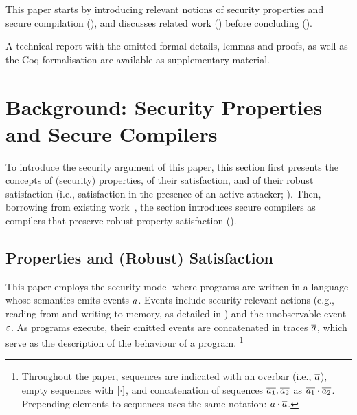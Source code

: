 \documentclass[dvipsnames,conference]{IEEEtran}
\theoremstyle{definition}
\begin{document}
% 
This paper starts by introducing relevant notions of security properties and secure compilation (),
and discusses related work () before concluding ().

 A technical report with the omitted formal details, lemmas and proofs, as well as the Coq formalisation are available as supplementary material.

\section{Background: Security Properties and Secure Compilers}\label{sec:background}

To introduce the security argument of this paper, this section first presents the concepts of (security) properties, of their satisfaction, and of their robust satisfaction (i.e., satisfaction in the presence of an active attacker; ).
Then, borrowing from existing work~\cite{abate2019jour,abate2021extacc}, the section introduces secure compilers as compilers that preserve robust property satisfaction ().

\subsection{Properties and (Robust) Satisfaction}\label{subsec:bg:tprop}

This paper employs the security model where programs are written in a language whose semantics emits events $\event$.
Events include security-relevant actions (e.g., reading from and writing to memory, as detailed in ) and the unobservable event $\emptyevent$.
As programs execute, their emitted events are concatenated in traces $\trace$, which serve as the description of the behaviour of a program.%
\footnote{
Throughout the paper, sequences are indicated with an overbar (i.e., $\trace$), empty sequences with $\hole{\cdot}$, and concatenation of sequences $\trace[_{1}],\trace[_{2}]$ as $\trace[_{1}]\cdot\trace[_{2}]$.
Prepending elements to sequences uses the same notation: $\event\cdot\trace$.
}
\end{document}

